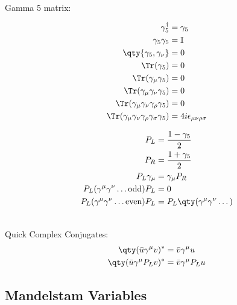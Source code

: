 	\\[0.25 cm]
	Gamma 5 matrix:
	\\
	\begin{minipage}{0.45\textwidth}
		\begin{align*}
			\gamma_5^\dagger&=\gamma_5
			\\
			\gamma_{5}\gamma_{5}&=\mathbb{I}
			\\
			\qty{\gamma_5,\gamma_\nu}&=0
			\\
			\Tr(\gamma_5)&=0
			\\
			\Tr(\gamma_\mu\gamma_5)&=0
			\\
			\Tr(\gamma_\mu\gamma_\nu\gamma_5)&=0
			\\
			\Tr(\gamma_\mu\gamma_\nu\gamma_\rho\gamma_5)&=0
			\\
			\Tr(\gamma_\mu\gamma_\nu\gamma_\rho\gamma_\sigma\gamma_5)&=4i\epsilon_{\mu\nu\rho\sigma}
		\end{align*}
	\end{minipage}
	\begin{minipage}{0.45\textwidth}
		\begin{align*}
			P_L&=\frac{1-\gamma_5}{2}
			\\
			P_R&=\frac{1+\gamma_5}{2}
			\\
			P_L\gamma_\mu&=\gamma_\mu P_R
			\\
			P_L(\gamma^\mu\gamma^\nu\dotsc\text{odd})P_L&=0
			\\
			P_L(\gamma^\mu\gamma^\nu\dotsc\text{even})P_L&=P_L\qty(\gamma^\mu\gamma^\nu\dotsc)
		\end{align*}
	\end{minipage}
	\\[0.25 cm]
	Quick Complex Conjugates:
	\\
	\begin{align*}
		\qty(\bar{u}\gamma^\mu v)^*&=\bar{v}\gamma^\mu u 
		\\
		\qty(\bar{u}\gamma^\mu P_Lv)^*&=\bar{v}\gamma^\mu P_L u
	\end{align*}
\newpage
\subsection{Mandelstam Variables}

